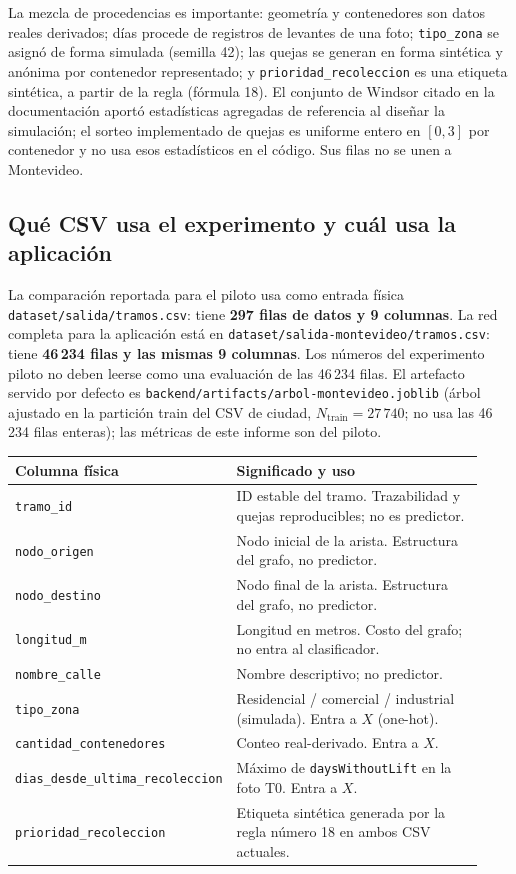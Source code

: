 \documentclass[11pt,a4paper]{article}
\begin{document}
La mezcla de procedencias es importante: geometría y contenedores son datos reales derivados; días procede de registros de levantes de una foto; \texttt{tipo\_zona} se asignó de forma simulada (semilla 42); las quejas se generan en forma sintética y anónima por contenedor representado; y \texttt{prioridad\_recoleccion} es una etiqueta sintética, a partir de la regla (fórmula 18). El conjunto de Windsor citado en la documentación aportó estadísticas agregadas de referencia al diseñar la simulación; el sorteo implementado de quejas es uniforme entero en $[0,3]$ por contenedor y no usa esos estadísticos en el código. Sus filas no se unen a Montevideo.

\subsection{Qué CSV usa el experimento y cuál usa la aplicación}
La comparación reportada para el piloto usa como entrada física \texttt{dataset/salida/tramos.csv}: tiene \textbf{297 filas de datos y 9 columnas}. La red completa para la aplicación está en \texttt{dataset/salida-montevideo/tramos.csv}: tiene \textbf{46\,234 filas y las mismas 9 columnas}. Los números del experimento piloto no deben leerse como una evaluación de las 46\,234 filas. El artefacto servido por defecto es \texttt{backend/artifacts/arbol-montevideo.joblib} (árbol ajustado en la partición train del CSV de ciudad, $N_{\mathrm{train}}=27\,740$; no usa las 46\,234 filas enteras); las métricas de este informe son del piloto.

\begin{longtable}{>{\ttfamily\small}p{0.27\linewidth}p{0.66\linewidth}}
\toprule
Columna física & Significado y uso \\
\midrule
\endhead
\texttt{tramo\_id} & ID estable del tramo. Trazabilidad y quejas reproducibles; no es predictor. \\
\texttt{nodo\_origen} & Nodo inicial de la arista. Estructura del grafo, no predictor. \\
\texttt{nodo\_destino} & Nodo final de la arista. Estructura del grafo, no predictor. \\
\texttt{longitud\_m} & Longitud en metros. Costo del grafo; no entra al clasificador. \\
\texttt{nombre\_calle} & Nombre descriptivo; no predictor. \\
\texttt{tipo\_zona} & Residencial / comercial / industrial (simulada). Entra a $X$ (one-hot). \\
\texttt{cantidad\_contenedores} & Conteo real-derivado. Entra a $X$. \\
\texttt{dias\_desde\allowbreak\_ultima\allowbreak\_recoleccion} & Máximo de \texttt{daysWithoutLift} en la foto T0. Entra a $X$. \\
\texttt{prioridad\_recoleccion} & Etiqueta sintética generada por la regla número 18 en ambos CSV actuales. \\
\bottomrule
\end{longtable}
\end{document}
